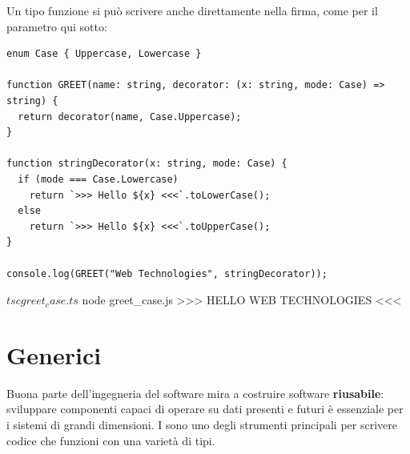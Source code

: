 Un tipo funzione si può scrivere anche direttamente nella firma, come per il
parametro  qui sotto:

\begin{affianco}[0.62][c]
\codicepiccolo
\begin{lstlisting}[style=ts, name=greet_case.ts]
enum Case { Uppercase, Lowercase }

function GREET(name: string, decorator: (x: string, mode: Case) => string) {
  return decorator(name, Case.Uppercase);
}

function stringDecorator(x: string, mode: Case) {
  if (mode === Case.Lowercase)
    return `>>> Hello ${x} <<<`.toLowerCase();
  else
    return `>>> Hello ${x} <<<`.toUpperCase();
}

console.log(GREET("Web Technologies", stringDecorator));
\end{lstlisting}
\risultato
\begin{console}[Terminale]
$ tsc greet_case.ts
$ node greet_case.js
>>> HELLO WEB TECHNOLOGIES <<<
\end{console}
\end{affianco}

\section{Generici}

Buona parte dell'ingegneria del software mira a costruire software
\textbf{riusabile}: sviluppare componenti capaci di operare su dati presenti e
futuri è essenziale per i sistemi di grandi dimensioni. I  sono
uno degli strumenti principali per scrivere codice che funzioni con una varietà
di tipi.

